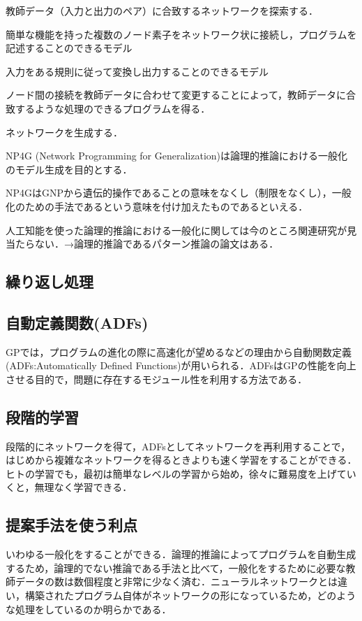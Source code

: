 \documentclass[exploratorypaper]{jsaiart} %
\begin{document}
教師データ（入力と出力のペア）に合致するネットワークを探索する．

簡単な機能を持った複数のノード素子をネットワーク状に接続し，プログラムを記述することのできるモデル

入力をある規則に従って変換し出力することのできるモデル

ノード間の接続を教師データに合わせて変更することによって，教師データに合致するような処理のできるプログラムを得る．

ネットワークを生成する．

NP4G (Network Programming for Generalization)は論理的推論における一般化のモデル生成を目的とする．

NP4GはGNPから遺伝的操作であることの意味をなくし（制限をなくし），一般化のための手法であるという意味を付け加えたものであるといえる．

人工知能を使った論理的推論における一般化に関しては今のところ関連研究が見当たらない．→論理的推論であるパターン推論の論文はある．
\subsection{繰り返し処理}


\subsection{自動定義関数(ADFs)}
GPでは，プログラムの進化の際に高速化が望めるなどの理由から自動関数定義(ADFs:Automatically Defined Functions)\cite{adfs}が用いられる．ADFsはGPの性能を向上させる目的で，問題に存在するモジュール性を利用する方法である．
\subsection{段階的学習}
段階的にネットワークを得て，ADFsとしてネットワークを再利用することで，はじめから複雑なネットワークを得るときよりも速く学習をすることができる．
ヒトの学習でも，最初は簡単なレベルの学習から始め，徐々に難易度を上げていくと，無理なく学習できる．

\subsection{提案手法を使う利点}
いわゆる一般化をすることができる．論理的推論によってプログラムを自動生成するため，論理的でない推論である手法と比べて，一般化をするために必要な教師データの数は数個程度と非常に少なく済む．ニューラルネットワークとは違い，構築されたプログラム自体がネットワークの形になっているため，どのような処理をしているのか明らかである．
\end{document}
